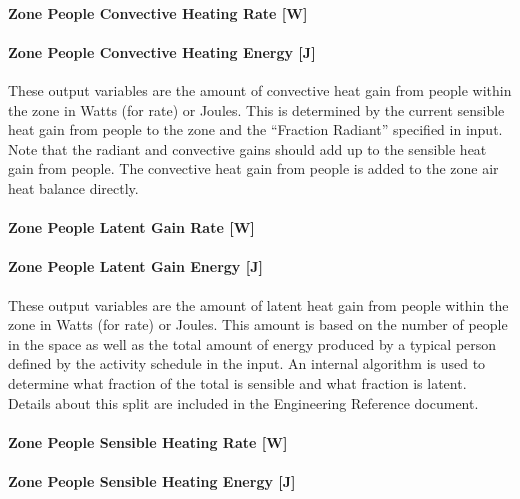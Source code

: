 \paragraph{Zone People Convective Heating Rate {[}W{]}}\label{zone-people-convective-heating-rate-w}

\paragraph{Zone People Convective Heating Energy {[}J{]}}\label{zone-people-convective-heating-energy-j}

These output variables are the amount of convective heat gain from people within the zone in Watts (for rate) or Joules. This is determined by the current sensible heat gain from people to the zone and the ``Fraction Radiant'' specified in input. Note that the radiant and convective gains should add up to the sensible heat gain from people. The convective heat gain from people is added to the zone air heat balance directly.

\paragraph{Zone People Latent Gain Rate {[}W{]}}\label{zone-people-latent-gain-rate-w}

\paragraph{Zone People Latent Gain Energy {[}J{]}}\label{zone-people-latent-gain-energy-j}

These output variables are the amount of latent heat gain from people within the zone in Watts (for rate) or Joules. This amount is based on the number of people in the space as well as the total amount of energy produced by a typical person defined by the activity schedule in the input. An internal algorithm is used to determine what fraction of the total is sensible and what fraction is latent. Details about this split are included in the Engineering Reference document.

\paragraph{Zone People Sensible Heating Rate {[}W{]}}\label{zone-people-sensible-heating-rate-w}

\paragraph{Zone People Sensible Heating Energy {[}J{]}}\label{zone-people-sensible-heating-energy-j}

